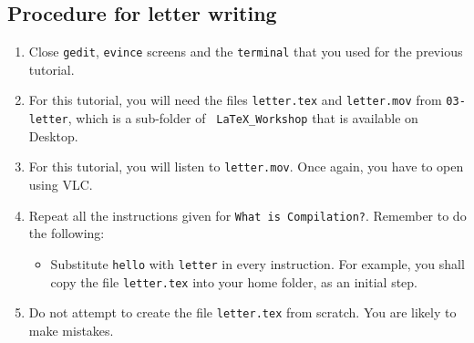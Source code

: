 \documentclass[11pt]{article}
\newenvironment{enumcpt}{\begin{enumerate} \topsep 0pt \partopsep 0pt 
                        \parsep 0pt
                        \itemsep 0pt \leftmargin -1in \rightmargin 0pt
                        }{\end{enumerate}}
\begin{document}
\begin{multicols}{2}
\section{Procedure for letter writing}
\begin{enumcpt}
\item Close {\tt gedit}, {\tt evince} screens and the {\tt terminal}
  that you used for the previous tutorial. 
\item For this tutorial, you will need the files {\tt letter.tex} and
  {\tt letter.mov} from {\tt 03-letter}, which is a sub-folder of {\tt
    LaTeX\_Workshop} that is available on Desktop.
\item For this tutorial, you will listen to {\tt letter.mov}.  Once
  again, you have to open using VLC.  
\item Repeat all the instructions given for {\tt What is
    Compilation?}.  Remember to do the following:
\begin{itemize}
\item    Substitute {\tt hello} with {\tt letter} in every instruction.
    For example, you shall copy the file {\tt letter.tex} into your
    home folder, as an initial step.
  \end{itemize}
\item Do not attempt to create the file {\tt letter.tex} from
  scratch.  You are likely to make mistakes.
\end{enumcpt}


\end{multicols}
\end{document}
